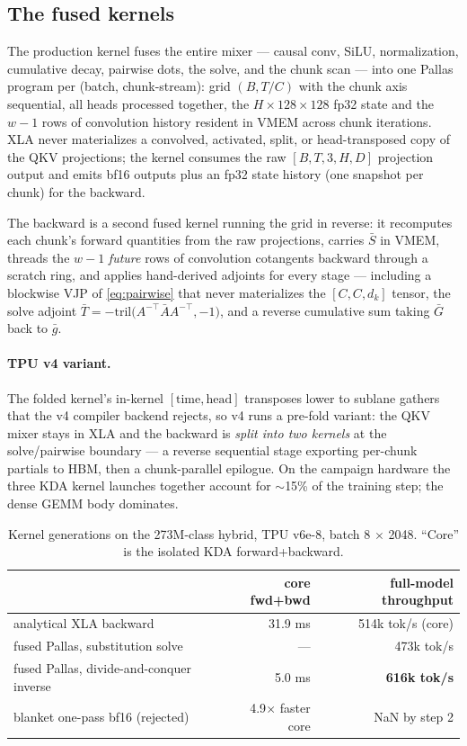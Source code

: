 \subsection{The fused kernels}

The production kernel fuses the entire mixer --- causal conv, SiLU,
normalization, cumulative decay, pairwise dots, the solve, and the
chunk scan --- into one Pallas program per (batch, chunk-stream): grid
$(B, T/C)$ with the chunk axis sequential, all heads processed together,
the $H \times 128 \times 128$ fp32 state and the $w{-}1$ rows of
convolution history resident in VMEM across chunk iterations. XLA never
materializes a convolved, activated, split, or head-transposed copy of
the QKV projections; the kernel consumes the raw $[B, T, 3, H, D]$
projection output and emits bf16 outputs plus an fp32 state history
(one snapshot per chunk) for the backward.

The backward is a second fused kernel running the grid in reverse: it
recomputes each chunk's forward quantities from the raw projections,
carries $\bar{S}$ in VMEM, threads the $w{-}1$ \emph{future} rows of
convolution cotangents backward through a scratch ring, and applies
hand-derived adjoints for every stage --- including a blockwise VJP of
\eqref{eq:pairwise} that never materializes the $[C, C, d_k]$ tensor,
the solve adjoint
$\bar{T} = -\mathrm{tril}\big(A^{-\top}\bar{A}A^{-\top}, -1\big)$,
and a reverse cumulative sum taking $\bar{G}$ back to $\bar{g}$.

\paragraph{TPU v4 variant.} The folded kernel's in-kernel
$[\mathrm{time},\mathrm{head}]$ transposes lower to sublane gathers that
the v4 compiler backend rejects, so v4 runs a pre-fold variant: the QKV
mixer stays in XLA and the backward is \emph{split into two kernels} at
the solve/pairwise boundary --- a reverse sequential stage exporting
per-chunk partials to HBM, then a chunk-parallel epilogue. On the
campaign hardware the three KDA kernel launches together account for
$\sim$15\% of the training step; the dense GEMM body dominates.

\begin{table}[h]
\centering
\small
\caption{Kernel generations on the 273M-class hybrid, TPU v6e-8, batch 8
$\times$ 2048. ``Core'' is the isolated KDA forward+backward.}
\label{tab:kernels}
\begin{tabular}{lrr}
\toprule
 & core fwd+bwd & full-model throughput \\
\midrule
analytical XLA backward & 31.9 ms & 514k tok/s (core) \\
fused Pallas, substitution solve & --- & 473k tok/s \\
fused Pallas, divide-and-conquer inverse & 5.0 ms & \textbf{616k tok/s} \\
\midrule
blanket one-pass bf16 (rejected) & 4.9$\times$ faster core & NaN by step 2 \\
\bottomrule
\end{tabular}
\end{table}

